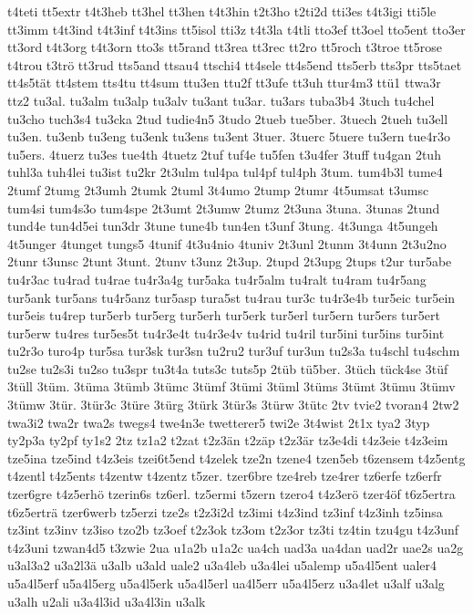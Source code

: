 {t4teti
tt5extr
t4t3heb
tt3hel
tt3hen
t4t3hin
t2t3ho
t2ti2d
tti3es
t4t3igi
tti5le
tt3imm
t4t3ind
t4t3inf
t4t3ins
tt5isol
tti3z
t4t3la
t4tli
tto3ef
tt3oel
tto5ent
tto3er
tt3ord
t4t3org
t4t3orn
tto3s
tt5rand
tt3rea
tt3rec
tt2ro
tt5roch
t3troe
tt5rose
t4trou
t3trö
tt3rud
tts5and
ttsau4
ttschi4
tt4sele
tt4s5end
tts5erb
tts3pr
tts5taet
tt4s5tät
tt4stem
tts4tu
tt4sum
ttu3en
ttu2f
tt3ufe
tt3uh
ttur4m3
ttü1
ttwa3r
ttz2
tu3al.
tu3alm
tu3alp
tu3alv
tu3ant
tu3ar.
tu3ars
tuba3b4
3tuch
tu4chel
tu3cho
tuch3s4
tu3cka
2tud
tudie4n5
3tudo
2tueb
tue5ber.
3tuech
2tueh
tu3ell
tu3en.
tu3enb
tu3eng
tu3enk
tu3ens
tu3ent
3tuer.
3tuerc
5tuere
tu3ern
tue4r3o
tu5ers.
4tuerz
tu3es
tue4th
4tuetz
2tuf
tuf4e
tu5fen
t3u4fer
3tuff
tu4gan
2tuh
tuhl3a
tuh4lei
tu3ist
tu2kr
2t3ulm
tul4pa
tul4pf
tul4ph
3tum.
tum4b3l
tume4
2tumf
2tumg
2t3umh
2tumk
2tuml
3t4umo
2tump
2tumr
4t5umsat
t3umsc
tum4si
tum4s3o
tum4spe
2t3umt
2t3umw
2tumz
2t3una
3tuna.
3tunas
2tund
tund4e
tun4d5ei
tun3dr
3tune
tune4b
tun4en
t3unf
3tung.
4t3unga
4t5ungeh
4t5unger
4tunget
tungs5
4tunif
4t3u4nio
4tuniv
2t3unl
2tunm
3t4unn
2t3u2no
2tunr
t3unsc
2tunt
3tunt.
2tunv
t3unz
2t3up.
2tupd
2t3upg
2tups
t2ur
tur5abe
tu4r3ac
tu4rad
tu4rae
tu4r3a4g
tur5aka
tu4r5alm
tu4ralt
tu4ram
tu4r5ang
tur5ank
tur5ans
tu4r5anz
tur5asp
tura5st
tu4rau
tur3c
tu4r3e4b
tur5eic
tur5ein
tur5eis
tu4rep
tur5erb
tur5erg
tur5erh
tur5erk
tur5erl
tur5ern
tur5ers
tur5ert
tur5erw
tu4res
tur5es5t
tu4r3e4t
tu4r3e4v
tu4rid
tu4ril
tur5ini
tur5ins
tur5int
tu2r3o
turo4p
tur5sa
tur3sk
tur3sn
tu2ru2
tur3uf
tur3un
tu2s3a
tu4schl
tu4schm
tu2se
tu2s3i
tu2so
tu3spr
tu3t4a
tuts3c
tuts5p
2tüb
tü5ber.
3tüch
tück4se
3tüf
3tüll
3tüm.
3tüma
3tümb
3tümc
3tümf
3tümi
3tüml
3tüms
3tümt
3tümu
3tümv
3tümw
3tür.
3tür3c
3türe
3türg
3türk
3tür3s
3türw
3tütc
2tv
tvie2
tvoran4
2tw2
twa3i2
twa2r
twa2s
twegs4
twe4n3e
twetterer5
twi2e
3t4wist
2t1x
tya2
3typ
ty2p3a
ty2pf
ty1s2
2tz
tz1a2
t2zat
t2z3än
t2zäp
t2z3är
tz3e4di
t4z3eie
t4z3eim
tze5ina
tze5ind
t4z3eis
tzei6t5end
t4zelek
tze2n
tzene4
tzen5eb
t6zensem
t4z5entg
t4zentl
t4z5ents
t4zentw
t4zentz
t5zer.
tzer6bre
tze4reb
tze4rer
tz6erfe
tz6erfr
tzer6gre
t4z5erhö
tzerin6s
tz6erl.
tz5ermi
t5zern
tzero4
t4z3erö
tzer4öf
t6z5ertra
t6z5erträ
tzer6werb
tz5erzi
tze2s
t2z3i2d
tz3imi
t4z3ind
tz3inf
t4z3inh
tz5insa
tz3int
tz3inv
tz3iso
tzo2b
tz3oef
t2z3ok
tz3om
t2z3or
tz3ti
tz4tin
tzu4gu
t4z3unf
t4z3uni
tzwan4d5
t3zwie
2ua
u1a2b
u1a2c
ua4ch
uad3a
ua4dan
uad2r
uae2s
ua2g
u3al3a2
u3a2l3ä
u3alb
u3ald
uale2
u3a4leb
u3a4lei
u5alemp
u5a4l5ent
ualer4
u5a4l5erf
u5a4l5erg
u5a4l5erk
u5a4l5erl
ua4l5err
u5a4l5erz
u3a4let
u3alf
u3alg
u3alh
u2ali
u3a4l3id
u3a4l3in
u3alk
}
